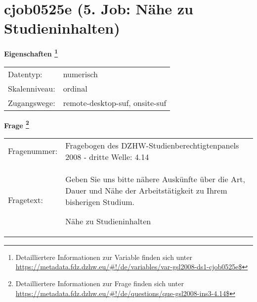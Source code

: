 
    \setcounter{footnote}{0}

    \vspace*{-1.8cm}
	\section{cjob0525e (5. Job: Nähe zu Studieninhalten)}
	\label{section:cjob0525e}



    \vspace*{0.5cm}
    \noindent\textbf{Eigenschaften
	\footnote{Detailliertere Informationen zur Variable finden sich unter
		\url{https://metadata.fdz.dzhw.eu/\#!/de/variables/var-gsl2008-ds1-cjob0525e$}}}\\
	\begin{tabularx}{\hsize}{@{}lX}
	Datentyp: & numerisch \\
	Skalenniveau: & ordinal \\
	Zugangswege: &
	  remote-desktop-suf, 
	  onsite-suf
 \\
    \end{tabularx}



				\vspace*{0.5cm}
                \noindent\textbf{Frage
	                \footnote{Detailliertere Informationen zur Frage finden sich unter
		              \url{https://metadata.fdz.dzhw.eu/\#!/de/questions/que-gsl2008-ins3-4.14$}}}\\
				\begin{tabularx}{\hsize}{@{}lX}
					Fragenummer: &
					  Fragebogen des DZHW-Studienberechtigtenpanels 2008 - dritte Welle:
					  4.14
 \\
					Fragetext: & Geben Sie uns bitte nähere Auskünfte über die Art, Dauer und Nähe der Arbeitstätigkeit zu Ihrem bisherigen Studium.\par  Nähe zu Studieninhalten \\
				\end{tabularx}





